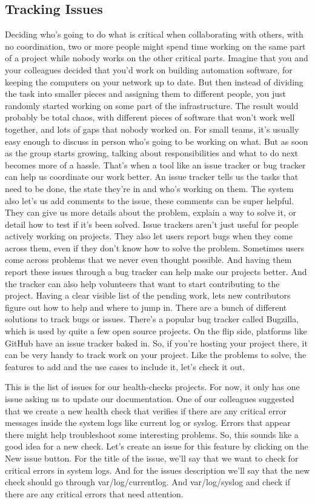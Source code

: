 	\subsection{Tracking Issues}
	
	
	Deciding who's going to do what is critical when collaborating with others, with no coordination, two or more people might spend time working on the same part of a project while nobody works on the other critical parts. Imagine that you and your colleagues decided that you'd work on building automation software, for keeping the computers on your network up to date. But then instead of dividing the task into smaller pieces and assigning them to different people, you just randomly started working on some part of the infrastructure. The result would probably be total chaos, with different pieces of software that won't work well together, and lots of gaps that nobody worked on. For small teams, it's usually easy enough to discuss in person who's going to be working on what. But as soon as the group starts growing, talking about responsibilities and what to do next becomes more of a hassle. That's when a tool like an issue tracker or bug tracker can help us coordinate our work better. An issue tracker tells us the tasks that need to be done, the state they're in and who's working on them. The system also let's us add comments to the issue, these comments can be super helpful. They can give us more details about the problem, explain a way to solve it, or detail how to test if it's been solved. Issue trackers aren't just useful for people actively working on projects. They also let users report bugs when they come across them, even if they don't know how to solve the problem. Sometimes users come across problems that we never even thought possible. And having them report these issues through a bug tracker can help make our projects better. And the tracker can also help volunteers that want to start contributing to the project. Having a clear visible list of the pending work, lets new contributors figure out how to help and where to jump in. There are a bunch of different solutions to track bugs or issues. There's a popular bug tracker called Bugzilla, which is used by quite a few open source projects. On the flip side, platforms like GitHub have an issue tracker baked in. So, if you're hosting your project there, it can be very handy to track work on your project. Like the problems to solve, the features to add and the use cases to include it, let's check it out.

	This is the list of issues for our health-checks projects. For now, it only has one issue asking us to update our documentation. One of our colleagues suggested that we create a new health check that verifies if there are any critical error messages inside the system logs like current log or syslog. Errors that appear there might help troubleshoot some interesting problems. So, this sounds like a good idea for a new check. Let's create an issue for this feature by clicking on the New issue button. For the title of the issue, we'll say that we want to check for critical errors in system logs. And for the issues description we'll say that the new check should go through var/log/currentlog. And var/log/syslog and check if there are any critical errors that need attention.

